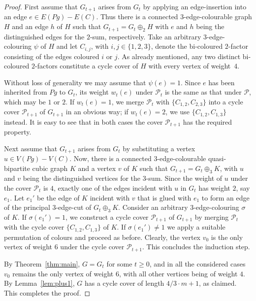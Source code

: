 \documentclass[a4paper]{amsart}
\theoremstyle{plain}
\theoremstyle{definition}
\begin{document}
\begin{proof}
First assume that $G_{t+1}$ arises from $G_t$ by applying an
edge-insertion into an edge $e\in E(Pg)-E(C)$. Thus there is a
connected $3$-edge-colourable graph $H$ and an edge $h$ of $H$
such that $G_{t+1}=G_t\oplus_2 H$ with $e$ and $h$ being the
distinguished edges for the $2$-sum, respectively. Take an
arbitrary $3$-edge-colouring $\psi$ of $H$ and let $C_{i,j}$,
with $i,j\in\{1,2,3\}$, denote the bi-coloured $2$-factor
consisting of the edges coloured $i$ or $j$. As already
mentioned, any two distinct bi-coloured $2$-factors constitute
a cycle cover of $H$ with every vertex of weight~$4$.

Without loss of generality we may assume that $\psi(e)=1$.
Since $e$ has been inherited from $Pg$ to $G_t$, its weight
$w_t(e)$ under $\mathcal{P}_t$ is the same as that under
$\mathcal{P}$, which may be $1$ or $2$. If $w_t(e)=1$, we merge
$\mathcal{P}_t$ with $\{C_{1,2}, C_{2,3}\}$ into a cycle cover
$\mathcal{P}_{t+1}$ of $G_{t+1}$ in an obvious way; if
$w_t(e)=2$, we use $\{C_{1,2}, C_{1,3}\}$ instead. It is easy
to see that in both cases the cover $\mathcal{P}_{t+1}$ has the
required property.

Next assume that $G_{t+1}$ arises from $G_t$ by substituting a
vertex $u\in V(Pg)-V(C)$. Now, there is a connected
$3$-edge-colourable quasi-bipartite cubic graph $K$ and a
vertex $v$ of $K$ such that $G_{t+1}=G_t\oplus_3 K$, with $u$
and $v$ being the distinguished vertices for the $3$-sum. Since
the weight of $u$ under the cover $\mathcal{P}_t$ is $4$,
exactly one of the edges incident with $u$ in $G_t$ has weight
$2$, say $e_1$. Let $e_1'$ be the edge of $K$ incident with $v$
that is glued with $e_1$ to form an edge of the principal
$3$-edge-cut of $G_t\oplus_3 K$. Consider an arbitrary
$3$-edge-colouring $\sigma$ of $K$. If $\sigma(e_1')=1$, we
construct a cycle cover $\mathcal{P}_{t+1}$ of $G_{t+1}$ by
merging $\mathcal{P}_t$ with the cycle cover $\{C_{1,2},
C_{1,3}\}$ of $K$. If $\sigma(e_1')\ne 1$ we apply a suitable
permutation of colours and proceed as before. Clearly, the
vertex $v_0$ is the only vertex of weight $6$ under the cycle
cover $\mathcal{P}_{t+1}$. This concludes the induction step.

By Theorem~\ref{thm:main}, $G=G_t$ for some $t\ge 0$,
and in all the considered cases $v_0$ remains the only vertex
of weight $6$, with all other vertices being of weight $4$. By
Lemma~\ref{lem:plus1}, $G$ has a cycle cover of length
$4/3\cdot m+1$, as claimed. This completes the proof.
\end{proof}
\end{document}

